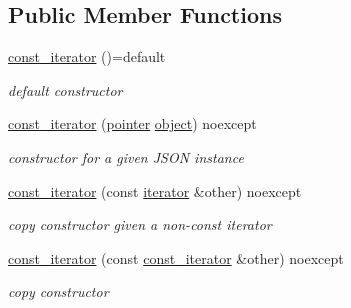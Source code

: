 \subsection*{Public Member Functions}
\begin{DoxyCompactItemize}
\item 
\mbox{\label{classnlohmann_1_1basic__json_1_1const__iterator_ac6fdaff67857f82a623e5cc253917639}} 
\hyperlink{classnlohmann_1_1basic__json_1_1const__iterator_ac6fdaff67857f82a623e5cc253917639}{const\+\_\+iterator} ()=default
\begin{DoxyCompactList}\small\item\em default constructor \end{DoxyCompactList}\item 
\hyperlink{classnlohmann_1_1basic__json_1_1const__iterator_a23de834b11bd895209aa65c100ab9ceb}{const\+\_\+iterator} (\hyperlink{classnlohmann_1_1basic__json_1_1const__iterator_a1da96fc3054d547e7706d3a2f073f389}{pointer} \hyperlink{classnlohmann_1_1basic__json_ad25b2f8c21e241e2d63455537a9294ff}{object}) noexcept
\begin{DoxyCompactList}\small\item\em constructor for a given J\+S\+ON instance \end{DoxyCompactList}\item 
\hyperlink{classnlohmann_1_1basic__json_1_1const__iterator_a6b950c6bc081ac1ec1540ec05ceb2603}{const\+\_\+iterator} (const \hyperlink{classnlohmann_1_1basic__json_1_1iterator}{iterator} \&other) noexcept
\begin{DoxyCompactList}\small\item\em copy constructor given a non-\/const iterator \end{DoxyCompactList}\item 
\hyperlink{classnlohmann_1_1basic__json_1_1const__iterator_a18c35a6735d3da96b4fc026421c05dd8}{const\+\_\+iterator} (const \hyperlink{classnlohmann_1_1basic__json_1_1const__iterator}{const\+\_\+iterator} \&other) noexcept
\begin{DoxyCompactList}\small\item\em copy constructor \end{DoxyCompactList}\item 

\end{DoxyCompactItemize}
